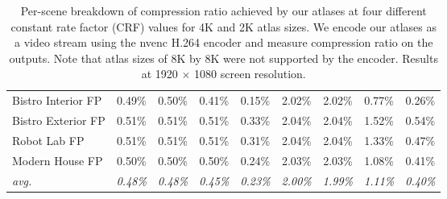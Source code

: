 \begin{table}
\begin{tabular}{lcccc|cccc}
Bistro Interior FP & 0.49\%               & 0.50\%               & 0.41\%               & 0.15\%               & 2.02\%               & 2.02\%               & 0.77\%               & 0.26\%               \\
Bistro Exterior FP & 0.51\%               & 0.51\%               & 0.51\%               & 0.33\%               & 2.04\%               & 2.04\%               & 1.52\%               & 0.54\%               \\
Robot Lab FP       & 0.51\%               & 0.51\%               & 0.51\%               & 0.31\%               & 2.04\%               & 2.04\%               & 1.33\%               & 0.47\%               \\
Modern House FP    & 0.50\%               & 0.50\%               & 0.50\%               & 0.24\%               & 2.03\%               & 2.03\%               & 1.08\%               & 0.41\%               \\
\hline
\textit{avg.}      & \textit{0.48\%}      & \textit{0.48\%}      & \textit{0.45\%}      & \textit{0.23\%}      & \textit{2.00\%}      & \textit{1.99\%}      & \textit{1.11\%}      & \textit{0.40\%}      \\
\end{tabular}
\vspace{1mm}
\caption{Per-scene breakdown of compression ratio achieved by our atlases at four different constant rate factor (CRF) values for 4K and 2K atlas sizes. We encode our atlases as a video stream using the nvenc H.264 encoder and measure compression ratio on the outputs. Note that atlas sizes of 8K by 8K were not supported by the encoder. Results at 1920 $\times$ 1080 screen resolution.}
\label{tab:supp_compression}
\vspace{-3mm}
\end{table}
